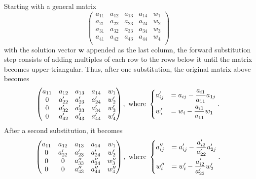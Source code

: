 \documentclass{article}
\begin{document}
        Starting with a general matrix
        \begin{equation*}
            \begin{pmatrix}
                a_{11} & a_{12} & a_{13} & a_{14} & w_1 \\
                a_{21} & a_{22} & a_{23} & a_{24} & w_2 \\
                a_{31} & a_{32} & a_{33} & a_{34} & w_3 \\
                a_{41} & a_{42} & a_{43} & a_{44} & w_4 \\
            \end{pmatrix}
        \end{equation*}
        with the solution vector $\mathbf{w}$ appended as the last column, the forward substitution step consists of adding multiples of each row to the rows below it until the matrix becomes upper-triangular. Thus, after one substitution, the original matrix above becomes
        \begin{equation*}
            \begin{pmatrix}
                a_{11} & a_{12}  & a_{13}  & a_{14}  & w_1 \\
                0      & a'_{22} & a'_{23} & a'_{24} & w'_2 \\
                0      & a'_{32} & a'_{33} & a'_{34} & w'_3 \\
                0      & a'_{42} & a'_{43} & a'_{44} & w'_4 \\
            \end{pmatrix}, \text{ where }
            \begin{dcases}
                a'_{ij} &= a_{ij} - \frac{a_{i1}}{a_{11}} a_{1j} \\
                w'_i    &= w_i - \frac{a_{i1}}{a_{11}} w_1
            \end{dcases}.
        \end{equation*}
        After a second substitution, it becomes
        \begin{equation*}
            \begin{pmatrix}
                a_{11} & a_{12}  & a_{13}   & a_{14}   & w_1   \\
                0      & a'_{22} & a'_{23}  & a'_{24}  & w'_2  \\
                0      & 0       & a''_{33} & a''_{34} & w''_3 \\
                0      & 0       & a''_{43} & a''_{44} & w''_4 \\
            \end{pmatrix}, \text{ where }
            \begin{dcases}
                a''_{ij} &= a'_{ij} - \frac{a'_{i2}}{a'_{22}} a'_{2j} \\
                w''_i    &= w'_i - \frac{a'_{i2}}{a'_{22}} w'_2
            \end{dcases}.
        \end{equation*}
\end{document}
